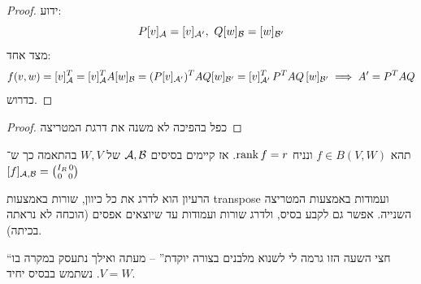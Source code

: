 \documentclass[]{../../../../tex/classes/styledArticle}
\begin{document}
    \begin{proof}
        ידוע: 
        \[ P[v]_{\mathcal{A}} = [v]_{\mathcal{A}'}, \ Q[w]_{\mathcal{B}} = [w]_{\mathcal{B}'} \]
        מצד אחד: 
        \[ f(v, w) = [v]_{\mathcal{A}}^T = [v]_{\mathcal{A}}^T A [w]_{\mathcal{B}} = (P[v]_{\mathcal{A} '})^TAQ[w]_{\mathcal{B}'} = [v]_{\mathcal{A}'}^T \, P^T A Q \, [w]_{\mathcal{B}'} \implies A' = P^T A Q \]
        כדרוש. 
    \end{proof}
    
    \begin{proof}
        כפל בהפיכה לא משנה את דרגת המטריצה
    \end{proof}
    
    \begin{Collary}
        תהא $f \in B(V, W)$ ונניח $\operatorname{rank} f = r$. אז קיימים בסיסים $\mathcal{A}, \mathcal{B}$ של $W, V$ בהתאמה כך ש־$[f]_{\mathcal{A}, \mathcal{B}} = \binom{I_R \, 0}{0\,\,\,\, 0}$
    \end{Collary}
    הרעיון הוא לדרג את כל כיוון, שורות באמצעות transpose ועמודות באמצעות המטריצה השנייה. אפשר גם לקבע בסיס, ולדרג שורות ועמודות עד שיוצאים אפסים (הוכחה לא נראתה בכיתה). 
    
    ``חצי השעה הזו גרמה לי לשנוא מלבנים בצורה יוקדת'' – מעתה ואילך נתעסק במקרה בו $V = W$. נשתמש בבסיס יחיד. 
    
    \ndoc
\end{document}
